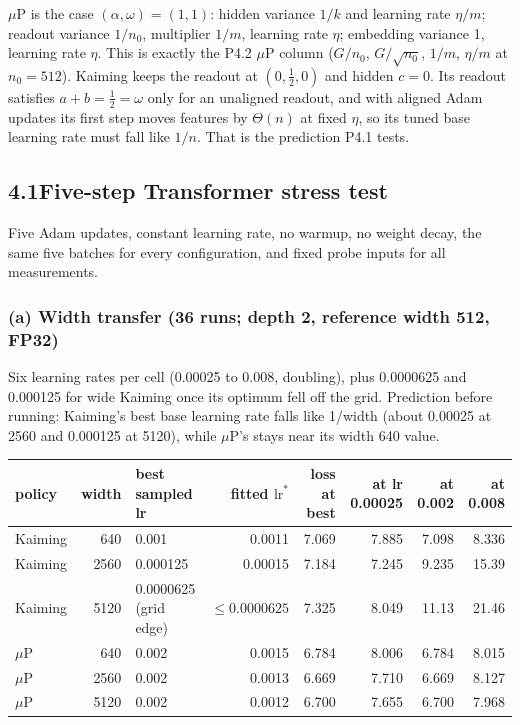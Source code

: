 \documentclass[10pt,letterpaper]{article}
\newcommand{\muP}{$\mu$P}
\newcommand{\lrs}{\ensuremath{\mathrm{lr}^{*}}}
\begin{document}
\muP{} is the case $(\alpha,\omega)=(1,1)$: hidden variance $1/k$ and learning rate $\eta/m$; readout variance $1/n_0$, multiplier $1/m$, learning rate $\eta$; embedding variance 1, learning rate $\eta$. This is exactly the P4.2 \muP{} column ($G/n_0$, $G/\sqrt{n_0}$, $1/m$, $\eta/m$ at $n_0=512$). Kaiming keeps the readout at $(0,\tfrac12,0)$ and hidden $c=0$. Its readout satisfies $a+b=\tfrac12=\omega$ only for an unaligned readout, and with aligned Adam updates its first step moves features by $\Theta(n)$ at fixed $\eta$, so its tuned base learning rate must fall like $1/n$. That is the prediction P4.1 tests.

\subsection*{4.1\quad Five-step Transformer stress test}

Five Adam updates, constant learning rate, no warmup, no weight decay, the same five batches for every configuration, and fixed probe inputs for all measurements.

\subsubsection*{(a) Width transfer (36 runs; depth 2, reference width 512, FP32)}

Six learning rates per cell (0.00025 to 0.008, doubling), plus 0.0000625 and 0.000125 for wide Kaiming once its optimum fell off the grid. Prediction before running: Kaiming's best base learning rate falls like 1/width (about 0.00025 at 2560 and 0.000125 at 5120), while \muP's stays near its width 640 value.

\begin{table}[H]\centering\small
\begin{tabular}{lrlrrrrr}\toprule
policy & width & best sampled lr & fitted $\lrs$ & loss at best & at lr 0.00025 & at 0.002 & at 0.008\\\midrule
Kaiming & 640 & 0.001 & 0.0011 & 7.069 & 7.885 & 7.098 & 8.336\\
Kaiming & 2560 & 0.000125 & 0.00015 & 7.184 & 7.245 & 9.235 & 15.39\\
Kaiming & 5120 & 0.0000625 (grid edge) & $\le0.0000625$ & 7.325 & 8.049 & 11.13 & 21.46\\
\muP & 640 & 0.002 & 0.0015 & 6.784 & 8.006 & 6.784 & 8.015\\
\muP & 2560 & 0.002 & 0.0013 & 6.669 & 7.710 & 6.669 & 8.127\\
\muP & 5120 & 0.002 & 0.0012 & 6.700 & 7.655 & 6.700 & 7.968\\\bottomrule
\end{tabular}
\end{table}
\end{document}
